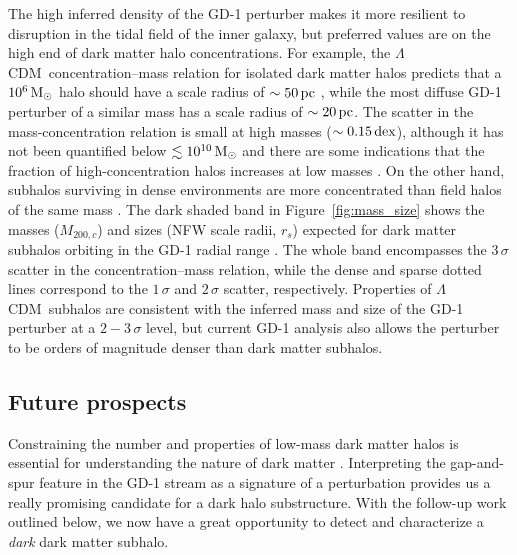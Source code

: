 \documentclass[twocolumn]{aastex62}
\newcommand{\acronym}[1]{{\small{#1}}}
\newcommand{\lcdm}{\acronym{$\Lambda$CDM}}
\begin{document}
The high inferred density of the GD-1 perturber makes it more resilient to disruption in the tidal field of the inner galaxy, but preferred values are on the high end of dark matter halo concentrations.
For example, the \lcdm\ concentration--mass relation for isolated dark matter halos predicts that a $10^6\,\rm M_\odot$ halo should have a scale radius of $\sim50\,\rm pc$ \citep{diemer2018}, while the most diffuse GD-1 perturber of a similar mass has a scale radius of $\sim20\,\rm pc$.
The scatter in the mass-concentration relation is small at high masses ($\sim0.15\,\rm dex$), although it has not been quantified below $\lesssim10^{10}\,\rm M_\odot$ and there are some indications that the fraction of high-concentration halos increases at low masses \citep{diemer2015}.
On the other hand, subhalos surviving in dense environments are more concentrated than field halos of the same mass \citep[e.g.,][]{avilareese2005}.
The dark shaded band in Figure~\ref{fig:mass_size} shows the masses ($M_{200,c}$) and sizes (NFW scale radii, $r_s$) expected for dark matter subhalos orbiting in the GD-1 radial range \citep{moline2017}.
The whole band encompasses the $3\,\sigma$ scatter in the concentration--mass relation, while the dense and sparse dotted lines correspond to the $1\,\sigma$ and $2\,\sigma$ scatter, respectively.
Properties of \lcdm\ subhalos are consistent with the inferred mass and size of the GD-1 perturber at a $2-3\,\sigma$ level, but current GD-1 analysis also allows the perturber to be orders of magnitude denser than dark matter subhalos.


\subsection{Future prospects}
\label{sec:future}
Constraining the number and properties of low-mass dark matter halos is essential for understanding the nature of dark matter \citep{bullockmbk2017}.
Interpreting the gap-and-spur feature in the GD-1 stream as a signature of a perturbation provides us a really promising candidate for a dark halo substructure.
With the follow-up work outlined below, we now have a great opportunity to detect and characterize a \emph{dark} dark matter subhalo.
\end{document}
